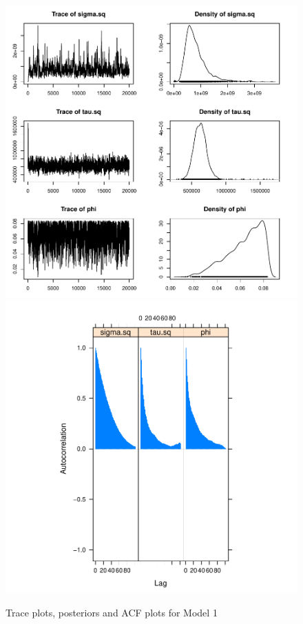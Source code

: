 \documentclass[12pt]{article}
\begin{document}
	\begin{figure}[H]
		\centering
		\includegraphics[scale=0.55]{Plots_North+South/v1_both.pdf}
		\includegraphics[scale=0.55]{Plots_North+South/v1_both_acf.pdf}
		\caption{Trace plots, posteriors and ACF plots for Model 1}
	\end{figure}
	
\end{document}
